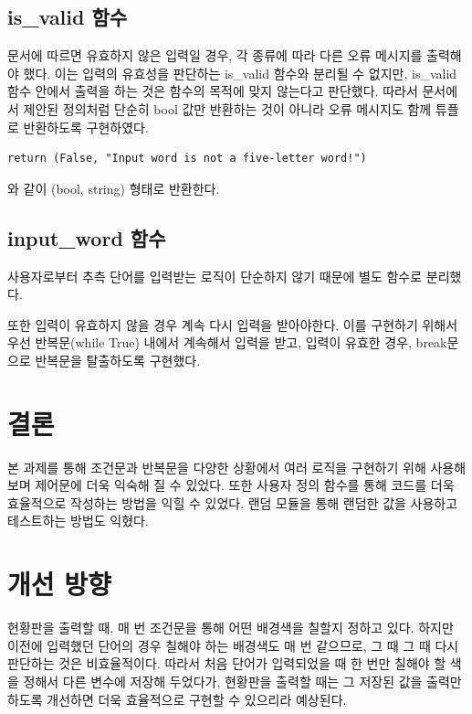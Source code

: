 \documentclass{article}
\begin{document}
\subsection{is\_valid 함수}
문서에 따르면 유효하지 않은 입력일 경우, 각 종류에 따라 다른 오류 메시지를 출력해야 했다.
이는 입력의 유효성을 판단하는 is\_valid 함수와 분리될 수 없지만,
is\_valid 함수 안에서 출력을 하는 것은 함수의 목적에 맞지 않는다고 판단했다.
따라서 문서에서 제안된 정의처럼 단순히 bool 값만 반환하는 것이 아니라 오류 메시지도 함께 튜플로 반환하도록
구현하였다. 
\begin{verbatim}
return (False, "Input word is not a five-letter word!")
\end{verbatim}
와 같이 (bool, string) 형태로 반환한다.

\subsection{input\_word 함수}
사용자로부터 추측 단어를 입력받는 로직이 단순하지 않기
때문에 별도 함수로 분리했다.

또한 입력이 유효하지 않을 경우 계속 다시 입력을 받아야한다.
이를 구현하기 위해서 우선 반복문(while True) 내에서 계속해서 입력을 받고,
입력이 유효한 경우, break문으로 반복문을 탈출하도록 구현했다.

\section{결론}

본 과제를 통해 조건문과 반복문을 다양한 상황에서 여러 로직을
구현하기 위해 사용해보며 제어문에 더욱 익숙해 질 수 있었다.
또한 사용자 정의 함수를 통해 코드를 더욱 효율적으로 작성하는 방법을
익힐 수 있었다. 랜덤 모듈을 통해 랜덤한 값을 사용하고 테스트하는 방법도
익혔다.

\section{개선 방향}

현황판을 출력할 때, 매 번 조건문을 통해 어떤 배경색을 칠할지 정하고 있다.
하지만 이전에 입력했던 단어의 경우 칠해야 하는 배경색도 매 번 같으므로,
그 때 그 때 다시 판단하는 것은 비효율적이다. 따라서 처음 단어가 입력되었을 때
한 번만 칠해야 할 색을 정해서 다른 변수에 저장해 두었다가,
현황판을 출력할 때는 그 저장된 값을 출력만 하도록 개선하면 더욱 효율적으로
구현할 수 있으리라 예상된다.
\end{document}

